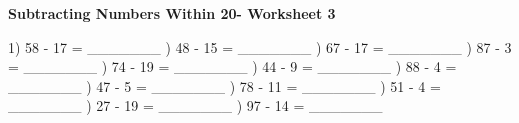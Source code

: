 \documentclass{article}%
\begin{document}
\newline%
\newline%
\newline%
\pagebreak%
\large%
\begin{center}%
\textbf{Subtracting Numbers Within 20- Worksheet 3}%
\newline%
\newline%
\newline%
\end{center} \normalsize%
1) 58 {-} 17 = \_\_\_\_\_\_\_%
\newline%
\newline%
) 48 {-} 15 = \_\_\_\_\_\_\_%
\newline%
\newline%
) 67 {-} 17 = \_\_\_\_\_\_\_%
\newline%
\newline%
) 87 {-} 3 = \_\_\_\_\_\_\_%
\newline%
\newline%
) 74 {-} 19 = \_\_\_\_\_\_\_%
\newline%
\newline%
) 44 {-} 9 = \_\_\_\_\_\_\_%
\newline%
\newline%
) 88 {-} 4 = \_\_\_\_\_\_\_%
\newline%
\newline%
) 47 {-} 5 = \_\_\_\_\_\_\_%
\newline%
\newline%
) 78 {-} 11 = \_\_\_\_\_\_\_%
\newline%
\newline%
) 51 {-} 4 = \_\_\_\_\_\_\_%
\newline%
\newline%
) 27 {-} 19 = \_\_\_\_\_\_\_%
\newline%
\newline%
) 97 {-} 14 = \_\_\_\_\_\_\_%
\newline%
\newline%
\end{document}
